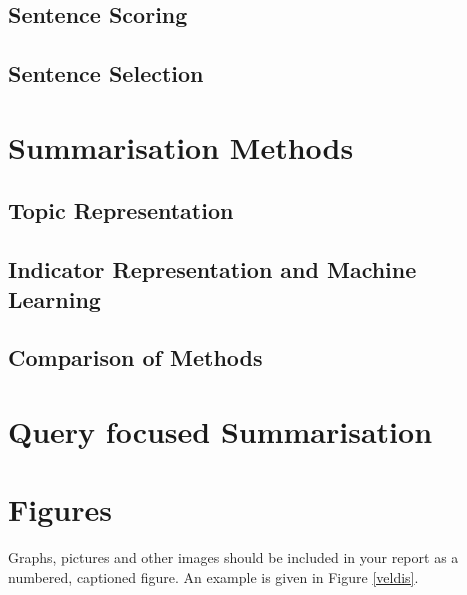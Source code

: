 \subsection{Sentence Scoring}

\subsection{Sentence Selection}

\section{Summarisation Methods}

\subsection{Topic Representation}

\subsection{Indicator Representation and Machine Learning}

\subsection{Comparison of Methods}

\section{Query focused Summarisation}



\section{Figures}
Graphs, pictures and other images should be included in your report as a numbered, captioned figure. An example is given in Figure \ref{veldis}.

